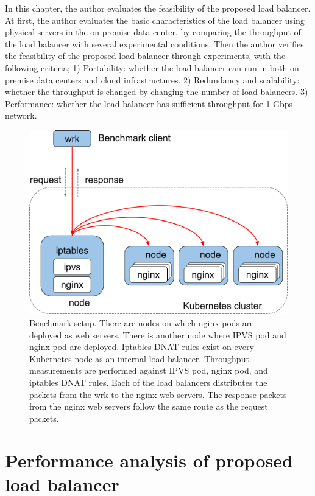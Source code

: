 In this chapter, the author evaluates the feasibility of the proposed load balancer.
At first, the author evaluates the basic characteristics of the load balancer using physical servers in the on-premise data center, by comparing the throughput of the load balancer with several experimental conditions.
Then the author verifies the feasibility of the proposed load balancer through experiments, with the following criteria;
1) Portability: whether the load balancer can run in both on-premise data centers and cloud infrastructures.
2) Redundancy and scalability: whether the throughput is changed by changing the number of load balancers.
3) Performance: whether the load balancer has sufficient throughput for 1 Gbps network.

\begin{figure}[h]
  \centering
  \includegraphics[width=0.8\columnwidth]{Figs/benchmark-schem}
  \par\bigskip
  \centering
  \begin{minipage}{0.9\columnwidth}
    \caption[Benchmark setup]{
      Benchmark setup.
      There are nodes on which nginx pods are deployed as web servers.
      There is another node where IPVS pod and nginx pod are deployed.
      Iptables DNAT rules exist on every Kubernetes node as an internal load balancer.
      Throughput measurements are performed against IPVS pod, nginx pod, and iptables DNAT rules.
      Each of the load balancers distributes the packets from the wrk to the nginx web servers.
      The response packets from the nginx web servers follow the same route as the request packets.  
    }
    \label{fig:benchmark-schem}
  \end{minipage}
\end{figure}

\section{Performance analysis of proposed load balancer}

